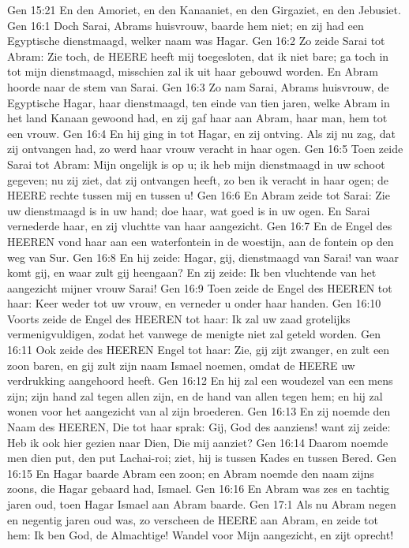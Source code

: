 Gen 15:21  En den Amoriet, en den Kanaaniet, en den Girgaziet, en den Jebusiet.
Gen 16:1  Doch Sarai, Abrams huisvrouw, baarde hem niet; en zij had een Egyptische dienstmaagd, welker naam was Hagar.
Gen 16:2  Zo zeide Sarai tot Abram: Zie toch, de HEERE heeft mij toegesloten, dat ik niet bare; ga toch in tot mijn dienstmaagd, misschien zal ik uit haar gebouwd worden. En Abram hoorde naar de stem van Sarai.
Gen 16:3  Zo nam Sarai, Abrams huisvrouw, de Egyptische Hagar, haar dienstmaagd, ten einde van tien jaren, welke Abram in het land Kanaan gewoond had, en zij gaf haar aan Abram, haar man, hem tot een vrouw.
Gen 16:4  En hij ging in tot Hagar, en zij ontving. Als zij nu zag, dat zij ontvangen had, zo werd haar vrouw veracht in haar ogen.
Gen 16:5  Toen zeide Sarai tot Abram: Mijn ongelijk is op u; ik heb mijn dienstmaagd in uw schoot gegeven; nu zij ziet, dat zij ontvangen heeft, zo ben ik veracht in haar ogen; de HEERE rechte tussen mij en tussen u!
Gen 16:6  En Abram zeide tot Sarai: Zie uw dienstmaagd is in uw hand; doe haar, wat goed is in uw ogen. En Sarai vernederde haar, en zij vluchtte van haar aangezicht.
Gen 16:7  En de Engel des HEEREN vond haar aan een waterfontein in de woestijn, aan de fontein op den weg van Sur.
Gen 16:8  En hij zeide: Hagar, gij, dienstmaagd van Sarai! van waar komt gij, en waar zult gij heengaan? En zij zeide: Ik ben vluchtende van het aangezicht mijner vrouw Sarai!
Gen 16:9  Toen zeide de Engel des HEEREN tot haar: Keer weder tot uw vrouw, en verneder u onder haar handen.
Gen 16:10  Voorts zeide de Engel des HEEREN tot haar: Ik zal uw zaad grotelijks vermenigvuldigen, zodat het vanwege de menigte niet zal geteld worden.
Gen 16:11  Ook zeide des HEEREN Engel tot haar: Zie, gij zijt zwanger, en zult een zoon baren, en gij zult zijn naam Ismael noemen, omdat de HEERE uw verdrukking aangehoord heeft.
Gen 16:12  En hij zal een woudezel van een mens zijn; zijn hand zal tegen allen zijn, en de hand van allen tegen hem; en hij zal wonen voor het aangezicht van al zijn broederen.
Gen 16:13  En zij noemde den Naam des HEEREN, Die tot haar sprak: Gij, God des aanziens! want zij zeide: Heb ik ook hier gezien naar Dien, Die mij aanziet?
Gen 16:14  Daarom noemde men dien put, den put Lachai-roi; ziet, hij is tussen Kades en tussen Bered.
Gen 16:15  En Hagar baarde Abram een zoon; en Abram noemde den naam zijns zoons, die Hagar gebaard had, Ismael.
Gen 16:16  En Abram was zes en tachtig jaren oud, toen Hagar Ismael aan Abram baarde.
Gen 17:1  Als nu Abram negen en negentig jaren oud was, zo verscheen de HEERE aan Abram, en zeide tot hem: Ik ben God, de Almachtige! Wandel voor Mijn aangezicht, en zijt oprecht!
